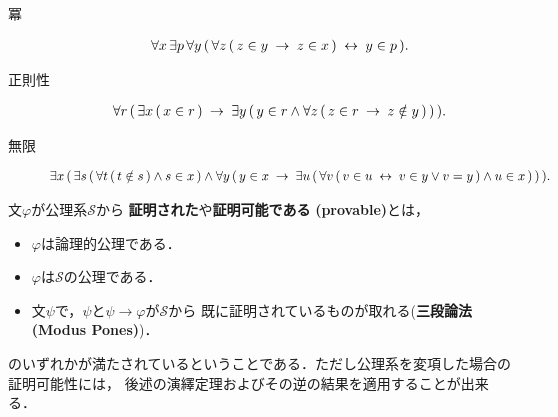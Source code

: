 \begin{description}
		\item[冪] 
			\begin{align}
				\forall x\, \exists p\, \forall y\, 
				(\, \forall z\, (\, z \in y \hspace{0.25em}\rightarrow\hspace{0.25em} z \in x\, ) \hspace{0.25em}\leftrightarrow\hspace{0.25em} y \in p\, ).
			\end{align}
			
		\item[正則性]
			\begin{align}
				\forall r\, (\, \exists x\, (\, x \in r\, )
				\hspace{0.25em}\rightarrow\hspace{0.25em} \exists y\, (\, y \in r \wedge \forall z\, 
				(\, z \in r \hspace{0.25em}\rightarrow\hspace{0.25em} z \notin y\, )\, )\, ).
			\end{align}
			
		\item[無限] 
			\begin{align}
				\exists x\, (\, 
				\exists s\, (\, \forall t\, (\, t \notin s\, ) \wedge s \in x\, ) 
				\wedge \forall y\, (\, 
				y \in x \hspace{0.25em}\rightarrow\hspace{0.25em} \exists u\, (\, 
				\forall v\, (\, v \in u \hspace{0.25em}\leftrightarrow\hspace{0.25em} v \in y \vee v = y\, )
				\wedge u \in x\, )\, )\, ).
			\end{align}
	\end{description}
	
	\begin{screen}
		\begin{metadfn}[証明可能]
			文$\varphi$が公理系$\mathscr{S}$から
			{\bf 証明された}や{\bf 証明可能である}
			{\bf (provable)}とは，
			\begin{itemize}
				\item $\varphi$は論理的公理である．
				\item $\varphi$は$\mathscr{S}$の公理である．
				\item 文$\psi$で，$\psi$と$\psi \rightarrow \varphi$が$\mathscr{S}$から
				既に証明されているものが取れる({\bf 三段論法}
				{\bf (Modus Pones)}\footnotemark)．
			\end{itemize}
			のいずれかが満たされているということである．ただし公理系を変項した場合の証明可能性には，
			後述の演繹定理およびその逆の結果を適用することが出来る．
		\end{metadfn}
	\end{screen}		
	
	
